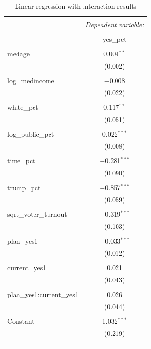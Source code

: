 \documentclass[
]{article}
\begin{document}
\begin{table}[!htbp] \centering 
  \caption{Linear regression with interaction results} 
  \label{interactionResults} 
\begin{tabular}{@{\extracolsep{5pt}}lc} 
\\[-1.8ex]\hline 
\hline \\[-1.8ex] 
 & \multicolumn{1}{c}{\textit{Dependent variable:}} \\ 
\cline{2-2} 
\\[-1.8ex] & yes\_pct \\ 
\hline \\[-1.8ex] 
 medage & 0.004$^{**}$ \\ 
  & (0.002) \\ 
  & \\ 
 log\_medincome & $-$0.008 \\ 
  & (0.022) \\ 
  & \\ 
 white\_pct & 0.117$^{**}$ \\ 
  & (0.051) \\ 
  & \\ 
 log\_public\_pct & 0.022$^{***}$ \\ 
  & (0.008) \\ 
  & \\ 
 time\_pct & $-$0.281$^{***}$ \\ 
  & (0.090) \\ 
  & \\ 
 trump\_pct & $-$0.857$^{***}$ \\ 
  & (0.059) \\ 
  & \\ 
 sqrt\_voter\_turnout & $-$0.319$^{***}$ \\ 
  & (0.103) \\ 
  & \\ 
 plan\_yes1 & $-$0.033$^{***}$ \\ 
  & (0.012) \\ 
  & \\ 
 current\_yes1 & 0.021 \\ 
  & (0.043) \\ 
  & \\ 
 plan\_yes1:current\_yes1 & 0.026 \\ 
  & (0.044) \\ 
  & \\ 
 Constant & 1.032$^{***}$ \\ 
  & (0.219) \\ 
  & \\ 
\hline \\[-1.8ex] 

\end{tabular}
\end{table}
\end{document}
